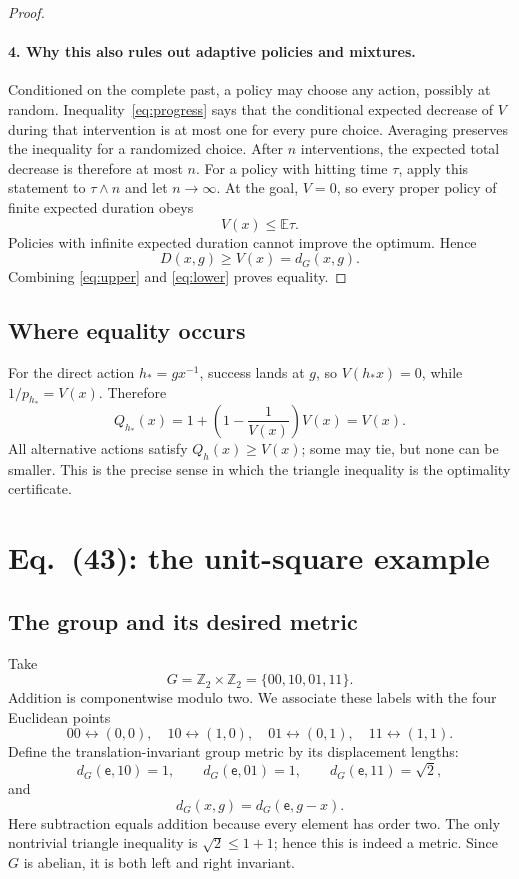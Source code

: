 \documentclass[11pt]{article}
\theoremstyle{definition}
\theoremstyle{remark}
\newcommand{\E}{\mathbb E}
\newcommand{\Z}{\mathbb Z}
\newcommand{\id}{\mathsf e}
\begin{document}
\begin{proof}
\paragraph{4. Why this also rules out adaptive policies and mixtures.}
Conditioned on the complete past, a policy may choose any action, possibly at
random.  Inequality~\eqref{eq:progress} says that the conditional expected
decrease of \(V\) during that intervention is at most one for every pure
choice. Averaging preserves the inequality for a randomized choice. After
\(n\) interventions, the expected total decrease is therefore at most \(n\).
For a policy with hitting time \(\tau\), apply this statement to
\(\tau\wedge n\) and let \(n\to\infty\). At the goal, \(V=0\), so every proper
policy of finite expected duration obeys
\[
  V(x)\le\E\tau.
\]
Policies with infinite expected duration cannot improve the optimum.  Hence
\begin{equation}
  D(x,g)\ge V(x)=d_G(x,g).
  \label{eq:lower}
\end{equation}
Combining \eqref{eq:upper} and \eqref{eq:lower} proves equality.
\end{proof}

\subsection{Where equality occurs}

For the direct action \(h_*=gx^{-1}\), success lands at \(g\), so
\(V(h_*x)=0\), while \(1/p_{h_*}=V(x)\). Therefore
\[
 Q_{h_*}(x)
 =1+\left(1-\frac1{V(x)}\right)V(x)
 =V(x).
\]
All alternative actions satisfy \(Q_h(x)\ge V(x)\); some may tie, but none can
be smaller.  This is the precise sense in which the triangle inequality is
the optimality certificate.

\section{Eq.~(43): the unit-square example}

\subsection{The group and its desired metric}

Take
\[
  G=\Z_2\times\Z_2=\{00,10,01,11\}.
\]
Addition is componentwise modulo two.  We associate these labels with the
four Euclidean points
\begin{equation}
  00\leftrightarrow(0,0),\quad
  10\leftrightarrow(1,0),\quad
  01\leftrightarrow(0,1),\quad
  11\leftrightarrow(1,1).
  \label{eq:coords}
\end{equation}
Define the translation-invariant group metric by its displacement lengths:
\begin{equation}
 d_G(\id,10)=1,\qquad
 d_G(\id,01)=1,\qquad
 d_G(\id,11)=\sqrt2,
 \label{eq:lengths}
\end{equation}
and
\[
 d_G(x,g)=d_G(\id,g-x).
\]
Here subtraction equals addition because every element has order two.  The
only nontrivial triangle inequality is
\(\sqrt2\le1+1\); hence this is indeed a metric. Since \(G\) is abelian, it
is both left and right invariant.
\end{document}
